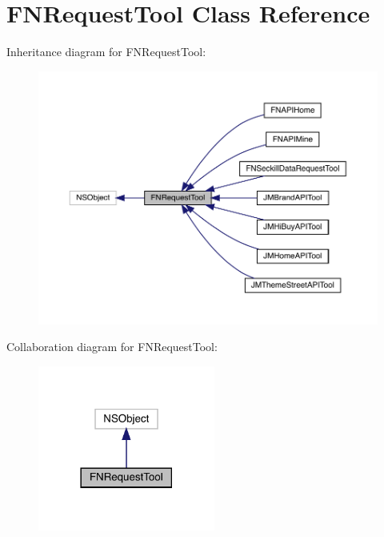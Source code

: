 \hypertarget{interface_f_n_request_tool}{}\section{F\+N\+Request\+Tool Class Reference}
\label{interface_f_n_request_tool}


Inheritance diagram for F\+N\+Request\+Tool\+:\nopagebreak
\begin{figure}[H]
\begin{center}
\leavevmode
\includegraphics[width=350pt]{interface_f_n_request_tool__inherit__graph}
\end{center}
\end{figure}


Collaboration diagram for F\+N\+Request\+Tool\+:\nopagebreak
\begin{figure}[H]
\begin{center}
\leavevmode
\includegraphics[width=165pt]{interface_f_n_request_tool__coll__graph}
\end{center}
\end{figure}
